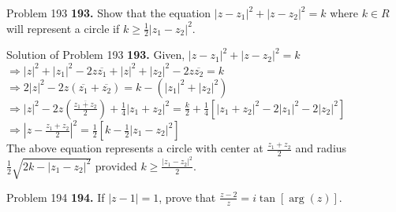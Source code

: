 \documentclass[aspectratio=169,8pt]{beamer}
\begin{document}
\begin{frame}{Problem 193}
  \textbf{193.} Show that the equation $|z - z_1|^2 + |z - z_2|^2 = k$ where $k\in R$ will
  represent a circle if $k\geq \frac{1}{2}|z_1 - z_2|^2$.
\end{frame}
\begin{frame}{Solution of Problem 193}
  \textbf{193.} Given, $|z - z_1|^2 + |z - z_2|^2 = k$\\
  \vspace*{0.2cm}
  $\Rightarrow |z|^2 + |z_1|^2 - 2z\overline{z_1} + |z|^2 + |z_2|^2 - 2z\overline{z_2} = k$\\
  \vspace*{0.2cm}
  $\Rightarrow 2|z|^2 - 2z(\overline{z_1} + \overline{z_2}) = k - (|z_1|^2 + |z_2|^2)$\\
  \vspace*{0.2cm}
  $\Rightarrow |z|^2 - 2z\left(\frac{\overline{z_1 + z_2}}{2}\right) + \frac{1}{4}|z_1 + z_2|^2 = \frac{k}{2} + \frac{1}{4}[|z_1 + z_2|^2 - 2|z_1|^2 -2|z_2|^2]$\\
  $\Rightarrow \left|z - \frac{z_1 + z_2}{2}\right|^2 = \frac{1}{2}\left[k - \frac{1}{2}|z_1 - z_2|^2\right]$\\
  \vspace*{0.2cm}
  The above equation represents a circle with center at $\frac{z_1 + z_2}{2}$ and radius $\frac{1}{2}\sqrt{2k - |z_1 - z_2|^2}$
  provided $k\geq \frac{|z_1 - z_2|^2}{2}$.
\end{frame}
\begin{frame}{Problem 194}
  \textbf{194.} If $|z - 1| = 1$, prove that $\frac{z - 2}{z} = i\tan[\arg(z)]$.
\end{frame}
\end{document}
